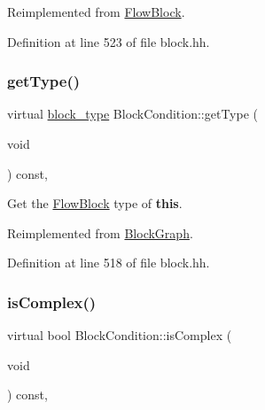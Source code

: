 Reimplemented from \mbox{\hyperlink{class_flow_block_a20996aacbad259e2e4a7bb0c72482335}{Flow\+Block}}.



Definition at line 523 of file block.\+hh.

\mbox{\label{class_block_condition_a654b72b19819b68c6f09e507dfee4ddd}} 
\subsubsection{\texorpdfstring{getType()}{getType()}}
{\footnotesize\ttfamily virtual \mbox{\hyperlink{class_flow_block_a70df78390870fcdd51e31426ba6a193e}{block\+\_\+type}} Block\+Condition\+::get\+Type (\begin{DoxyParamCaption}\item[{void}]{ }\end{DoxyParamCaption}) const\hspace{0.3cm}{\ttfamily [inline]}, {\ttfamily [virtual]}}



Get the \mbox{\hyperlink{class_flow_block}{Flow\+Block}} type of {\bfseries{this}}. 



Reimplemented from \mbox{\hyperlink{class_block_graph_a8e542e109e0acc977218ceaf3c248153}{Block\+Graph}}.



Definition at line 518 of file block.\+hh.

\mbox{\label{class_block_condition_a38493adfe801b32d82244de3ee75c6fc}} 
\subsubsection{\texorpdfstring{isComplex()}{isComplex()}}
{\footnotesize\ttfamily virtual bool Block\+Condition\+::is\+Complex (\begin{DoxyParamCaption}\item[{void}]{ }\end{DoxyParamCaption}) const\hspace{0.3cm}{\ttfamily [inline]}, {\ttfamily [virtual]}}



